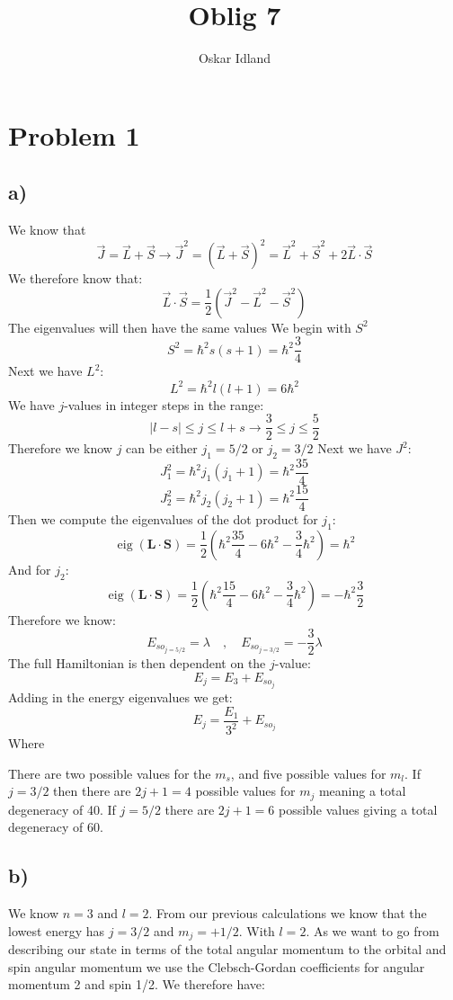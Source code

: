 \documentclass{article}
\author{Oskar Idland}
\title{Oblig 7}
\date{}
\begin{document}
\maketitle
\newpage

\section*{Problem 1}
\subsection*{a)}
We know that
\[
\vec{J} = \vec{L} + \vec{S} → \vec{J}^2 = (\vec{L} + \vec{S})^2 = \vec{L}^2 + \vec{S}^2 + 2\vec{L} ⋅ \vec{S}
\]
We therefore know that:
\[
\vec{L} ⋅ \vec{S} = \frac{1}{2}(\vec{J}^2 - \vec{L}^2 - \vec{S}^2)
\]
The eigenvalues will then have the same values
We begin with $S^2$
\[
S^2 = ℏ^2 s(s+1)  = ℏ^2 \frac{3}{4}
\]
Next we have $L^2$:
\[
L^2 = ℏ^2 l(l+1) = 6ℏ^2
\]
We have $j$-values in integer steps in the range:
\[
\left|l-s\right| \le j \le l+s → \frac{3}{2} \le  j \le \frac{5}{2}   
\]
Therefore we know $j$ can be either $j_1 = 5 / 2$ or $j_2 = 3 / 2$
Next we have $J^2$:
    \[
J_1^2 = ℏ^2 j_1(j_1+1) = ℏ^2 \frac{35}{4}
\]
\[
J_2^2 = ℏ^2 j_2(j_2+1) = ℏ^2 \frac{15}{4}
\]
Then we compute the eigenvalues of the dot product for $j_1$:
\[
\operatorname{eig} \left(\mathbf{L} ⋅ \mathbf{S}\right) = \frac{1}{2} \left(ℏ^2 \frac{35}{4} - 6ℏ^2 -  \frac{3}{4}ℏ^2\right) = ℏ^2
\]
And for $j_2$:
\[
\operatorname{eig} \left(\mathbf{L} ⋅ \mathbf{S}\right) = \frac{1}{2} \left(ℏ^2 \frac{15}{4} - 6ℏ^2 -  \frac{3}{4}ℏ^2\right) = - ℏ^2 \frac{3}{2}
\]
Therefore we know:
\[
E_{so_{j = 5 / 2}} = λ \quad , \quad E_{so_{j = 3 / 2}} = - \frac{3}{2} λ
\]
The full Hamiltonian is then dependent on the $j$-value:
\[
E_j = E_3 + E_{so_j} 
\]
Adding in the energy eigenvalues we get:
\[
E_j = \frac{E_1}{3^2} + E_{so_j}
\]
Where 


There are two possible values for the $m_s$, and five possible values for $m_l$. If $j = 3 / 2$ then there are  $2j + 1 = 4$ possible values for $m_j$ meaning a total degeneracy of 40. If $j = 5 / 2$ there are $2j + 1 = 6$ possible values giving a total degeneracy of 60.

\subsection*{b)}
We know $n=3$ and $l=2$. From our previous calculations we know that the lowest energy has $j = 3 / 2$ and $m_j = +1 / 2$. With $l = 2$. As we want to go from describing our state in terms of the total angular momentum to the orbital and spin angular momentum we use the Clebsch-Gordan coefficients for angular momentum 2 and spin 1/2. We therefore have:
\end{document}
